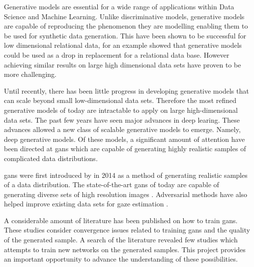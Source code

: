 

Generative models are essential for a wide range of applications within Data Science and Machine Learning. Unlike discriminative models, generative models are capable of reproducing the phenomenon they are modelling enabling them to be used for synthetic data generation. This have been shown to be successful for low dimensional relational data, for an example \textcite{patki2016synthetic} showed that generative models could be used as a drop in replacement for a relational data base. However achieving similar results on large high dimensional data sets have proven to be more challenging.

Until recently, there has been little progress in developing generative models that can scale beyond small low-dimensional data sets. Therefore the most refined generative models of today are intractable to apply on large high-dimensional data sets. The past few years have seen major advances in deep learing. These advances allowed a new class of scalable generative models to emerge. Namely, deep generative models. Of these models, a significant amount of attention have been directed at \acrfull{gans} which are capable of generating highly realistic samples of complicated data distributions.

\acrlong{gans} were first introduced by \textcite{goodfellow2014generative} in 2014 as a method of generating realistic samples of a data distribution. The state-of-the-art \acrshort{gans} of today are capable of generating diverse sets of high resolution images \cite{karras2017progressive}. Adversarial methods have also helped improve existing data sets for gaze estimation \cite{shrivastava2016learning,sela2017gazegan}. 

A considerable amount of literature has been published on how to train \acrshort{gans}. These studies consider convergence issues related to training \acrshort{gans} and the quality of the generated sample. A search of the literature revealed few studies which attempts to train new networks on the generated samples. This project provides an important opportunity to advance the understanding of these possibilities.

